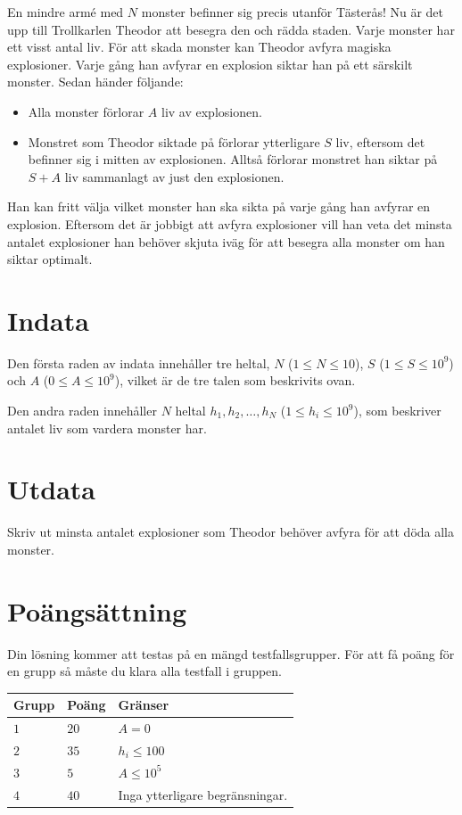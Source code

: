 
\noindent

En mindre armé med $N$ monster befinner sig precis utanför Tästerås! Nu är det upp
till Trollkarlen Theodor att besegra den och rädda staden. Varje monster har ett visst
antal liv. För att skada monster kan
Theodor avfyra magiska explosioner. Varje gång han avfyrar en explosion siktar han på ett
särskilt monster. Sedan händer följande:
\begin{itemize}
  \item Alla monster förlorar $A$ liv av explosionen.
  \item Monstret som Theodor siktade på förlorar ytterligare $S$ liv, 
  eftersom det befinner sig i mitten av explosionen. Alltså förlorar monstret han siktar
  på $S+A$ liv sammanlagt av just den explosionen.
\end{itemize}
Han kan fritt välja vilket monster han ska sikta på varje gång han avfyrar en explosion.
Eftersom det är jobbigt att avfyra explosioner vill han veta det minsta antalet
explosioner han behöver skjuta iväg för att besegra alla monster om han siktar optimalt.

\section*{Indata}
Den första raden av indata innehåller tre heltal, $N$ ($1 \leq N \leq 10$), $S$ ($1 \leq S \leq 10^9$)
och $A$ ($0 \leq A \leq 10^9$),
vilket är de tre talen som beskrivits ovan.

Den andra raden innehåller $N$ heltal $h_1, h_2, \ldots, h_N$ ($1 \leq h_i \leq 10^9$),
som beskriver antalet liv som vardera monster har.

\section*{Utdata}
Skriv ut minsta antalet explosioner som Theodor behöver avfyra för att döda alla monster.


\section*{Poängsättning}
Din lösning kommer att testas på en mängd testfallsgrupper.
För att få poäng för en grupp så måste du klara alla testfall i gruppen.

\noindent
\begin{tabular}{| l | l | p{12cm} |}
  \hline
  \textbf{Grupp} & \textbf{Poäng} & \textbf{Gränser} \\ \hline
  $1$    & $20$       & $A = 0$ \\ \hline
  $2$    & $35$       & $h_i \leq 100$ \\ \hline
  $3$    & $5$        & $A \leq 10^5$ \\ \hline
  $4$    & $40$       & Inga ytterligare begränsningar. \\ \hline
\end{tabular}


